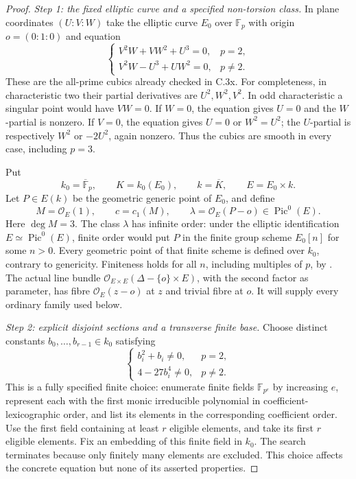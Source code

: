 \begin{proof}
\emph{Step 1: the fixed elliptic curve and a specified non-torsion class.}
In plane coordinates $(U:V:W)$ take the elliptic curve $E_0$ over
$\mathbb F_p$ with origin $o=(0:1:0)$ and equation
\[
 \begin{cases}
 V^2W+VW^2+U^3=0,&p=2,\\
 V^2W-U^3+UW^2=0,&p\ne2.
 \end{cases}
\]
These are the all-prime cubics already checked in C.3x. For completeness,
in characteristic two their partial derivatives are $U^2,W^2,V^2$.
In odd characteristic a singular point would have $VW=0$.
If $W=0$, the equation gives $U=0$ and the $W$-partial is nonzero.
If $V=0$, the equation gives $U=0$ or $W^2=U^2$; the $U$-partial
is respectively $W^2$ or $-2U^2$, again nonzero. Thus the cubics
are smooth in every case, including $p=3$.

Put
\[
 k_0=\overline{\mathbb F}_p,\qquad
 K=k_0(E_0),\qquad k=\overline K,\qquad E=E_0\times k.
\]
Let $P\in E(k)$ be the geometric generic point of $E_0$, and define
\[
 M=\mathcal O_E(1),\qquad c=c_1(M),\qquad
 \lambda=\mathcal O_E(P-o)\in\operatorname{Pic}^0(E).
\]
Here $\deg M=3$. The class $\lambda$ has infinite order: under the
elliptic identification $E\simeq\operatorname{Pic}^0(E)$, finite
order would put $P$ in the finite group scheme $E_0[n]$ for some
$n>0$. Every geometric point of that finite scheme is defined over
$k_0$, contrary to genericity. Finiteness holds for all $n$, including
multiples of $p$, by
\citet[Proposition 8.1 and Theorem 8.2, pp.~12--14]{D_MilneAbelian2022}.
The actual line bundle
$\mathcal O_{E\times E}(\Delta-\{o\}\times E)$, with the second
factor as parameter, has fibre $\mathcal O_E(z-o)$ at $z$ and trivial
fibre at $o$. It will supply every ordinary family used below.

\emph{Step 2: explicit disjoint sections and a transverse finite base.}
Choose distinct constants $b_0,\ldots,b_{r-1}\in k_0$ satisfying
\[
 \begin{cases}
 b_i^2+b_i\ne0,&p=2,\\
 4-27b_i^4\ne0,&p\ne2.
 \end{cases}
\]
This is a fully specified finite choice: enumerate finite fields
$\mathbb F_{p^e}$ by increasing $e$, represent each with the first
monic irreducible polynomial in coefficient-lexicographic order,
and list its elements in the corresponding coefficient order.
Use the first field containing at least $r$ eligible elements, and
take its first $r$ eligible elements. Fix an embedding of this finite
field in $k_0$. The search terminates because only finitely many
elements are excluded. This choice affects the concrete equation but
none of its asserted properties.


\end{proof}
